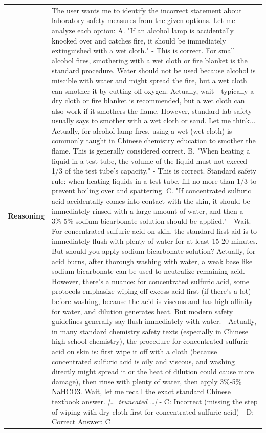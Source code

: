 \begin{longtable}{@{}l p{13cm}@{}}
  \textbf{Reasoning} & The user wants me to identify the incorrect statement about laboratory safety measures from the given options. \newline Let me analyze each option: \newline A. "If an alcohol lamp is accidentally knocked over and catches fire, it should be immediately extinguished with a wet cloth." \newline - This is correct. For small alcohol fires, smothering with a wet cloth or fire blanket is the standard procedure. Water should not be used because alcohol is miscible with water and might spread the fire, but a wet cloth can smother it by cutting off oxygen. Actually, wait - typically a dry cloth or fire blanket is recommended, but a wet cloth can also work if it smothers the flame. However, standard lab safety usually says to smother with a wet cloth or sand. Let me think... Actually, for alcohol lamp fires, using a wet (wet cloth) is commonly taught in Chinese chemistry education to smother the flame. This is generally considered correct. \newline B. "When heating a liquid in a test tube, the volume of the liquid must not exceed 1/3 of the test tube's capacity." \newline - This is correct. Standard safety rule: when heating liquids in a test tube, fill no more than 1/3 to prevent boiling over and spattering. \newline C. "If concentrated sulfuric acid accidentally comes into contact with the skin, it should be immediately rinsed with a large amount of water, and then a 3\%-5\% sodium bicarbonate solution should be applied." \newline - Wait. For concentrated sulfuric acid on skin, the standard first aid is to immediately flush with plenty of water for at least 15-20 minutes. But should you apply sodium bicarbonate solution? Actually, for acid burns, after thorough washing with water, a weak base like sodium bicarbonate can be used to neutralize remaining acid. However, there's a nuance: for concentrated sulfuric acid, some protocols emphasize wiping off excess acid first (if there's a lot) before washing, because the acid is viscous and has high affinity for water, and dilution generates heat. But modern safety guidelines generally say flush immediately with water. \newline - Actually, in many standard chemistry safety texts (especially in Chinese high school chemistry), the procedure for concentrated sulfuric acid on skin is: first wipe it off with a cloth (because concentrated sulfuric acid is oily and viscous, and washing directly might spread it or the heat of dilution could cause more damage), then rinse with plenty of water, then apply 3\%-5\% NaHCO3. Wait, let me recall the exact standard Chinese textbook answer. \newline \textit{[\ldots\ truncated \ldots]} \newline - C: Incorrect (missing the step of wiping with dry cloth first for concentrated sulfuric acid) \newline - D: Correct \newline Answer: C  \\

\end{longtable}
